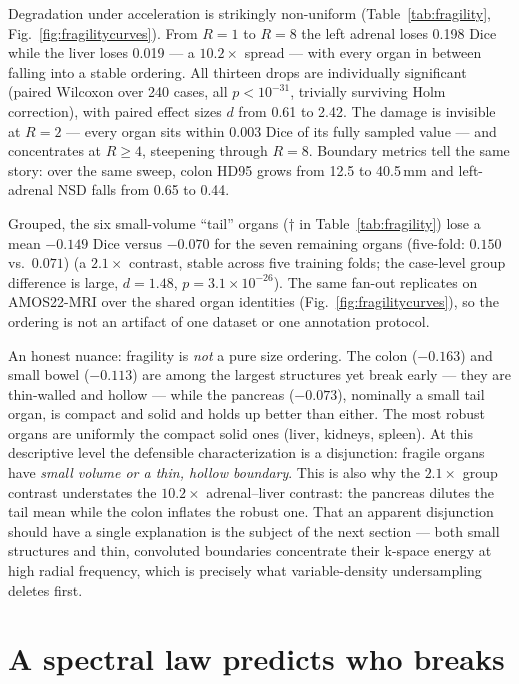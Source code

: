 \documentclass[10pt,twocolumn,letterpaper]{article}
\begin{document}
Degradation under acceleration is strikingly non-uniform (Table~\ref{tab:fragility}, Fig.~\ref{fig:fragilitycurves}). From $R{=}1$ to $R{=}8$ the left adrenal loses 0.198 Dice while the liver loses 0.019 --- a $10.2\times$ spread --- with every organ in between falling into a stable ordering. All thirteen drops are individually significant (paired Wilcoxon over 240 cases, all $p<10^{-31}$, trivially surviving Holm correction), with paired effect sizes $d$ from 0.61 to 2.42. The damage is invisible at $R{=}2$ --- every organ sits within 0.003 Dice of its fully sampled value --- and concentrates at $R\ge 4$, steepening through $R{=}8$. Boundary metrics tell the same story: over the same sweep, colon HD95 grows from 12.5 to 40.5\,mm and left-adrenal NSD falls from 0.65 to 0.44.

Grouped, the six small-volume ``tail'' organs ($\dagger$ in Table~\ref{tab:fragility}) lose a mean $-0.149$ Dice versus $-0.070$ for the seven remaining organs (five-fold: $0.150$ vs.\ $0.071$) (a $2.1\times$ contrast, stable across five training folds; the case-level group difference is large, $d{=}1.48$, $p{=}3.1\times10^{-26}$). The same fan-out replicates on AMOS22-MRI over the shared organ identities (Fig.~\ref{fig:fragilitycurves}), so the ordering is not an artifact of one dataset or one annotation protocol.

An honest nuance: fragility is \emph{not} a pure size ordering. The colon ($-0.163$) and small bowel ($-0.113$) are among the largest structures yet break early --- they are thin-walled and hollow --- while the pancreas ($-0.073$), nominally a small tail organ, is compact and solid and holds up better than either. The most robust organs are uniformly the compact solid ones (liver, kidneys, spleen). At this descriptive level the defensible characterization is a disjunction: fragile organs have \emph{small volume or a thin, hollow boundary}. This is also why the $2.1\times$ group contrast understates the $10.2\times$ adrenal--liver contrast: the pancreas dilutes the tail mean while the colon inflates the robust one. That an apparent disjunction should have a single explanation is the subject of the next section --- both small structures and thin, convoluted boundaries concentrate their k-space energy at high radial frequency, which is precisely what variable-density undersampling deletes first.

\section{A spectral law predicts who breaks}
\label{sec:law}
\end{document}
